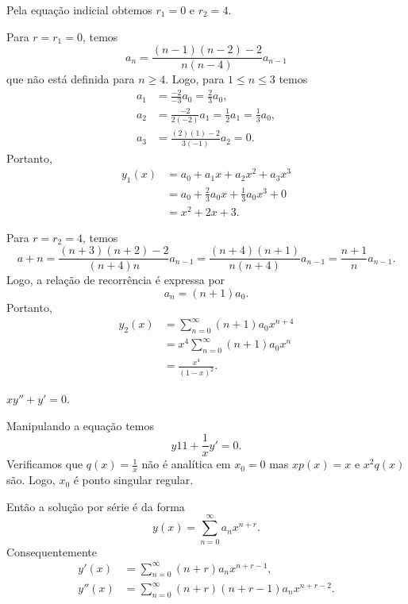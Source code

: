 \documentclass[a4paper,12pt, leqno, answers]{exam}
\begin{document}
\begin{questions}
\begin{solution}
        Pela equa\c{c}\~{a}o indicial obtemos $r_1 = 0$ e $r_2 = 4$.

        Para $r = r_1 = 0$, temos
        \[
        a_n = \frac{\left( n - 1 \right) \left( n - 2 \right) - 2}{n \left( n - 4 \right)} a_{n - 1}
        \]
        que n\~{a}o est\'{a} definida para $n \geq 4$. Logo, para $1 \leq n \leq 3$ temos
        \begin{align*}
            a_1 &= \frac{-2}{-3} a_0 = \frac{2}{3} a_0, \\
            a_2 &= \frac{-2}{2 \left( -2 \right)} a_1 = \frac{1}{2} a_1 = \frac{1}{3} a_0, \\
            a_3 &= \frac{\left( 2 \right) \left( 1 \right) - 2}{3\left( -1 \right)} a_2 = 0.
        \end{align*}
        Portanto,
        \begin{align*}
            y_1(x) &= a_0 + a_1 x + a_2 x^2 + a_3 x^3 \\
            &= a_0 + \frac{2}{3} a_0 x + \frac{1}{3} a_0 x^3 + 0 \\
            &= x^2 + 2 x + 3.
        \end{align*}

        Para $r = r_2 = 4$, temos
        \[
        a+n = \frac{\left( n + 3 \right) \left( n + 2 \right) - 2}{\left( n + 4 \right) n} a_{n - 1} = \frac{\left( n + 4 \right) \left( n + 1 \right)}{n \left( n + 4 \right)} a_{n - 1} = \frac{n + 1}{n} a_{n - 1}.
        \]
        Logo, a rela\c{c}\~{a}o de recorr\^{e}ncia \'{e} expressa por
        \[
        a_n = \left( n + 1 \right) a_0.
        \]
        Portanto,
        \begin{align*}
            y_2 (x) &= \sum_{n = 0}^\infty \left( n + 1 \right) a_0 x^{n + 4} \\
            &= x^4 \sum_{n = 0}^\infty \left( n + 1 \right) a_0 x^n \\
            &= \frac{x^4}{\left( 1 - x \right)^2}.
        \end{align*}
    \end{solution}

    \question $x y'' + y' = 0$.
    \begin{solution}
        Manipulando a equa\c{c}\~{a}o temos
        \[
        y11 + \frac{1}{x} y' = 0.
        \]
        Verificamos que $q(x) = \frac{1}{x}$ n\~{a}o \'{e} anal\'{i}tica em $x_0 = 0$ mas $x p(x) = x$ e $x^2 q(x)$ s\~{a}o. Logo, $x_0$ \'{e} ponto singular regular.

        Ent\~{a}o a solu\c{c}\~{a}o por s\'{e}rie \'{e} da forma
        \[
        y(x) = \sum_{n = 0}^\infty a_n x^{n + r}.
        \]
        Consequentemente
        \begin{align*}
            y'(x) &= \sum_{n = 0}^\infty \left( n + r \right) a_n x^{n + r - 1}, \\
            y''(x) &= \sum_{n = 0}^\infty \left( n + r \right) \left( n + r - 1 \right) a_n x^{n + r - 2}.
        \end{align*}


\end{solution}
\end{questions}
\end{document}
